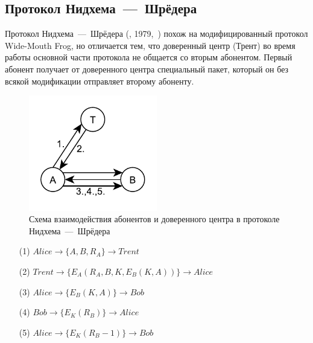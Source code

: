 \subsection{Протокол Нидхема~---~Шрёдера}\label{section-protocols-needham-schroeder}

Протокол Нидхема~---~Шрёдера (, 1979,~\cite{Needham:Schroeder:1978}) похож на модифицированный протокол Wide-Mouth Frog, но отличается тем, что доверенный центр (Трент) во время работы основной части протокола не общается со вторым абонентом. Первый абонент получает от доверенного центра специальный пакет, который он без всякой модификации отправляет второму абоненту.

\begin{figure}
    \centering
    \includegraphics[width=0.5\textwidth]{pic/key_distribution-needham-schroeder}
    \caption{Схема взаимодействия абонентов и доверенного центра в протоколе Нидхема~---~Шрёдера\label{fig:key_distribution-needham-schroeder}}
\end{figure}

\begin{samepage}\begin{itemize}
	\item[(1)] $ Alice	\rightarrow \{ A, B, R_A \}						\rightarrow Trent $
	\item[(2)] $ Trent	\rightarrow \{ E_A \left( R_A, B, K, E_B \left( K, A \right) \right) \}	\rightarrow Alice $
	\item[(3)] $ Alice	\rightarrow \{ E_B \left( K, A \right) \}				\rightarrow Bob $
	\item[(4)] $ Bob	\rightarrow \{ E_K \left( R_B \right) \}				\rightarrow Alice $
	\item[(5)] $ Alice	\rightarrow \{ E_K \left( R_B - 1 \right) \}				\rightarrow Bob $
\end{itemize}\end{samepage}

